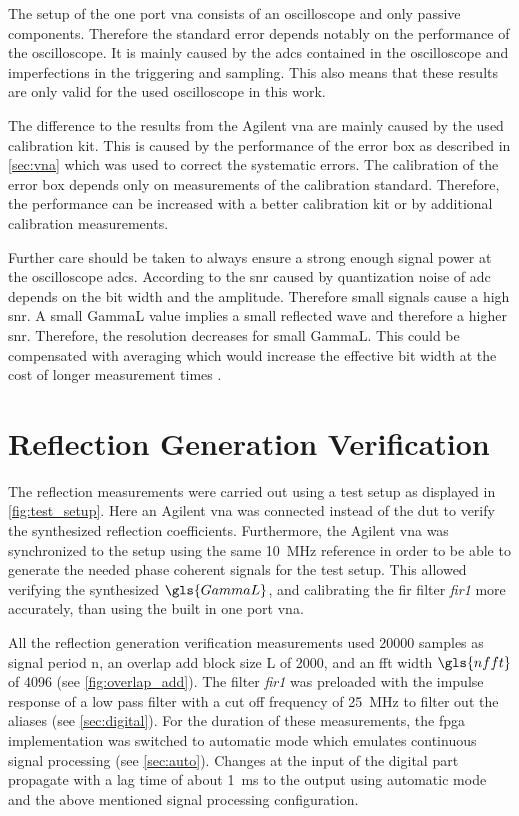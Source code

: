 \documentclass[12pt,a4paper,parskip=full,abstract=true,BCOR=12mm,twoside,open=right]{scrreprt}
\def\device#1{\textit{#1}}
\begin{document}
The setup of the one port \gls{vna} consists of an oscilloscope and only passive components.
Therefore the standard error depends notably on the performance of the oscilloscope. It is
mainly caused by the \glspl{adc} contained in the oscilloscope and imperfections in the
triggering and sampling. This also means that these results are only valid for the
used oscilloscope in this work.

The difference to the results from the Agilent \gls{vna} are mainly caused by the
used calibration kit. This is caused by the performance of the error box as described in
\cref{sec:vna} which was used to correct the systematic errors. The calibration of the error
box depends only on measurements of the calibration standard. Therefore, the performance can
be increased with a better calibration kit or by additional calibration measurements.

Further care should be taken to always ensure a strong enough signal power at the
oscilloscope \glspl{adc}. According to \cite{Oppenheim} the \gls{snr} caused by quantization
noise of \gls{adc} depends on the bit width and the amplitude. Therefore small signals cause
a high \gls{snr}. A small \gls{GammaL} value implies a small reflected wave and therefore a
higher \gls{snr}. Therefore, the resolution decreases for small \gls{GammaL}. This could
be compensated with averaging which would increase the effective bit width at the cost
of longer measurement times \cite{ad_mt004}.


\section{Reflection Generation Verification}
\label{sec:reflection}

The reflection measurements were carried out using a test setup as displayed in \cref{fig:test_setup}.
Here an Agilent \gls{vna} was connected instead of the \gls{dut} to verify the synthesized reflection
coefficients. Furthermore, the Agilent \gls{vna} was synchronized to the setup using the same
\SI{10}{\mega\hertz} reference in order to be able to generate the needed phase coherent
signals for the test setup. This allowed verifying the synthesized $\gls{GammaL}$, and
calibrating the \gls{fir} filter \device{fir1} more accurately, than using the built
in one port \gls{vna}.

All the reflection generation verification measurements used 20000 samples as signal period \gls{n},
an overlap add block size \gls{L} of 2000, and an \gls{fft} width $\gls{nfft}$ of 4096 (see
\cref{fig:overlap_add}). The filter \device{fir1} was preloaded with the
impulse response of a low pass filter with a cut off frequency of \SI{25}{\mega\hertz} to
filter out the aliases (see \cref{sec:digital}). For the duration of these measurements,
the \gls{fpga} implementation was switched to automatic mode which emulates continuous
signal processing (see \cref{sec:auto}). Changes at the input of the digital part propagate
with a lag time of about \SI{1}{\milli\second} to the output using automatic mode and the
above mentioned signal processing configuration.
\end{document}
